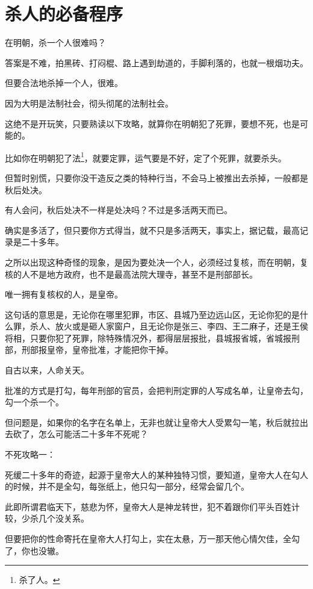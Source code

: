 \section{杀人的必备程序}
\ifnum{}
	\begin{multicols}{\theparacolNo}
		\fi
		在明朝，杀一个人很难吗？

		答案是不难，拍黑砖、打闷棍、路上遇到劫道的，手脚利落的，也就一根烟功夫。

		但要合法地杀掉一个人，很难。

		因为大明是法制社会，彻头彻尾的法制社会。

		这绝不是开玩笑，只要熟读以下攻略，就算你在明朝犯了死罪，要想不死，也是可能的。

		比如你在明朝犯了法\footnote{杀了人。}，就要定罪，运气要是不好，定了个死罪，就要杀头。

		但暂时别慌，只要你没干造反之类的特种行当，不会马上被推出去杀掉，一般都是秋后处决。

		有人会问，秋后处决不一样是处决吗？不过是多活两天而已。

		确实是多活了，但只要你方式得当，就不只是多活两天，事实上，据记载，最高记录是二十多年。

		之所以出现这种奇怪的现象，是因为要处决一个人，必须经过复核，而在明朝，复核的人不是地方政府，也不是最高法院大理寺，甚至不是刑部部长。

		唯一拥有复核权的人，是皇帝。

		这句话的意思是，无论你在哪里犯罪，市区、县城乃至边远山区，无论你犯的是什么罪，杀人、放火或是砸人家窗户，且无论你是张三、李四、王二麻子，还是王侯将相，只要你犯了死罪，除特殊情况外，都得层层报批，县城报省城，省城报刑部，刑部报皇帝，皇帝批准，才能把你干掉。

		自古以来，人命关天。

		批准的方式是打勾，每年刑部的官员，会把判刑定罪的人写成名单，让皇帝去勾，勾一个杀一个。

		但问题是，如果你的名字在名单上，无非也就让皇帝大人受累勾一笔，秋后就拉出去砍了，怎么可能活二十多年不死呢？

		不死攻略一：

		死缓二十多年的奇迹，起源于皇帝大人的某种独特习惯，要知道，皇帝大人在勾人的时候，并不是全勾，每张纸上，他只勾一部分，经常会留几个。

		此即所谓君临天下，慈悲为怀，皇帝大人是神龙转世，犯不着跟你们平头百姓计较，少杀几个没关系。

		但要把你的性命寄托在皇帝大人打勾上，实在太悬，万一那天他心情欠佳，全勾了，你也没辙。


\end{multicols}

